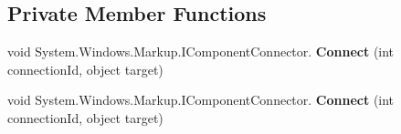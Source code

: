 \subsection*{Private Member Functions}
\begin{DoxyCompactItemize}
\item 
void System.\+Windows.\+Markup.\+I\+Component\+Connector. {\bfseries Connect} (int connection\+Id, object target)\hypertarget{class_p_c_builder_forms_1_1_questionnaire_af04ecdbdb6d1206ff7b04627ea55c08e}{}\label{class_p_c_builder_forms_1_1_questionnaire_af04ecdbdb6d1206ff7b04627ea55c08e}

\item 
void System.\+Windows.\+Markup.\+I\+Component\+Connector. {\bfseries Connect} (int connection\+Id, object target)\hypertarget{class_p_c_builder_forms_1_1_questionnaire_af04ecdbdb6d1206ff7b04627ea55c08e}{}\label{class_p_c_builder_forms_1_1_questionnaire_af04ecdbdb6d1206ff7b04627ea55c08e}


\end{DoxyCompactItemize}
